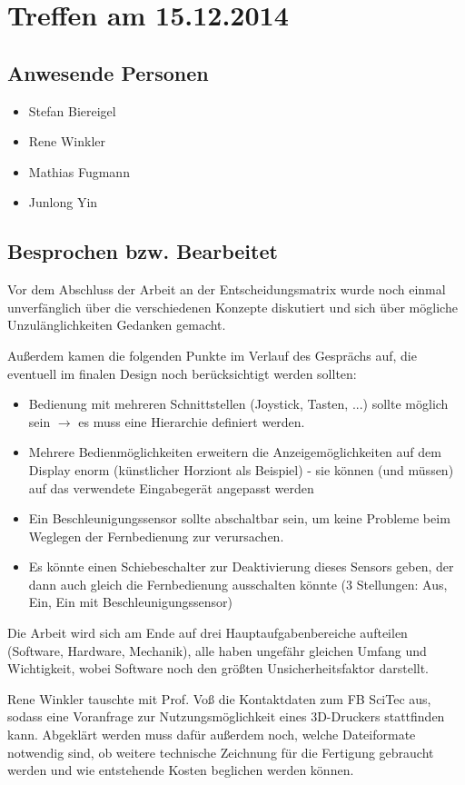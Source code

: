 \chapter{Treffen am 15.12.2014}
\section{Anwesende Personen}
\begin{itemize}
	\item Stefan Biereigel
	\item Rene Winkler
	\item Mathias Fugmann
	\item Junlong Yin
\end{itemize}

\section{Besprochen bzw. Bearbeitet}
Vor dem Abschluss der Arbeit an der Entscheidungsmatrix wurde noch einmal unverfänglich über die verschiedenen Konzepte diskutiert und sich über mögliche Unzulänglichkeiten Gedanken gemacht. 

Außerdem kamen die folgenden Punkte im Verlauf des Gesprächs auf, die eventuell im finalen Design noch berücksichtigt werden sollten:
\begin{itemize}
	\item Bedienung mit mehreren Schnittstellen (Joystick, Tasten, ...) sollte möglich sein $\rightarrow$ es muss eine Hierarchie definiert werden.
	\item Mehrere Bedienmöglichkeiten erweitern die Anzeigemöglichkeiten auf dem Display enorm (künstlicher Horziont als Beispiel) - sie können (und müssen) auf das verwendete Eingabegerät angepasst werden
	\item Ein Beschleunigungssensor sollte abschaltbar sein, um keine Probleme beim Weglegen der Fernbedienung zur verursachen.
	\item Es könnte einen Schiebeschalter zur Deaktivierung dieses Sensors geben, der dann auch gleich die Fernbedienung ausschalten könnte (3 Stellungen: Aus, Ein, Ein mit Beschleunigungssensor)
\end{itemize}

Die Arbeit wird sich am Ende auf drei Hauptaufgabenbereiche aufteilen (Software, Hardware, Mechanik), alle haben ungefähr gleichen Umfang und Wichtigkeit, wobei Software noch den größten Unsicherheitsfaktor darstellt.

Rene Winkler tauschte mit Prof. Voß die Kontaktdaten zum FB SciTec aus, sodass eine Voranfrage zur Nutzungsmöglichkeit eines 3D-Druckers stattfinden kann. Abgeklärt werden muss dafür außerdem noch, welche Dateiformate notwendig sind, ob weitere technische Zeichnung für die Fertigung gebraucht werden und wie entstehende Kosten beglichen werden können.


